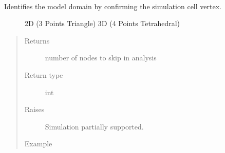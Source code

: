 \documentclass[letterpaper,10pt,english]{sphinxmanual}
\begin{document}
\begin{fulllineitems}
\begin{fulllineitems}
\begin{quote}
\begin{description}
\end{description}\end{quote}

\end{fulllineitems}


\begin{fulllineitems}
\label{\detokenize{openfdem:openfdem.openfdem.Model.model_domain}}~\begin{description}
\item[{Identifies the model domain by confirming the simulation cell vertex.}] \leavevmode
2D (3 Points \sphinxhyphen{} Triangle)
3D (4 Points \sphinxhyphen{} Tetrahedral)

\end{description}
\begin{quote}\begin{description}
\item[{Returns}] \leavevmode
number of nodes to skip in analysis

\item[{Return type}] \leavevmode
int

\item[{Raises}] \leavevmode
{} \textendash{} Simulation partially supported.

\item[{Example}] \leavevmode
\begin{sphinxVerbatim}[commandchars=\\\{\}]
   
  
\end{sphinxVerbatim}

\end{description}\end{quote}

\end{fulllineitems}


\end{fulllineitems}
\end{document}
